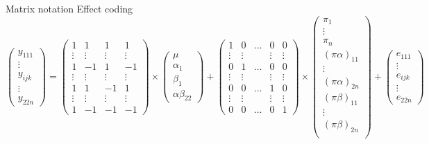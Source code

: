 \documentclass{beamer}
\begin{document}
\begin{frame}{Matrix notation}
{Effect coding}
{\tiny
\[
  \begin{pmatrix}
    y_{111}\\
    \vdots\\
    y_{ijk}\\
    \vdots\\
    y_{22n}
  \end{pmatrix}
=
  \begin{pmatrix}
    1 & 1 & 1 & 1\\
    \vdots & \vdots & \vdots & \vdots \\
    1 & -1 & 1 & -1\\
    \vdots & \vdots & \vdots & \vdots \\
    1 & 1 & -1 & 1\\
    \vdots & \vdots & \vdots & \vdots \\
    1 & -1 & -1 & -1
  \end{pmatrix}
\times
  \begin{pmatrix}
    \mu\\
    \alpha_1\\
    \beta_1\\
    \alpha\beta_{22}
  \end{pmatrix}
+
  \begin{pmatrix}
    1 & 0 & \dots & 0 & 0\\
    \vdots & \vdots && \vdots & \vdots \\
    0 & 1 & \dots & 0 & 0\\
    \vdots & \vdots && \vdots & \vdots \\
    0 & 0 & \dots & 1 & 0\\
    \vdots & \vdots && \vdots & \vdots \\
    0 & 0 & \dots & 0 & 1
  \end{pmatrix}
\times
  \begin{pmatrix}
    \pi_1\\
    \vdots\\
    \pi_n\\
    (\pi\alpha)_{11}\\
    \vdots\\
    (\pi\alpha)_{2n}\\
    (\pi\beta)_{11}\\
    \vdots\\
    (\pi\beta)_{2n}\\
  \end{pmatrix}
+
  \begin{pmatrix}
    e_{111}\\
    \vdots\\
    e_{ijk}\\
    \vdots\\
    e_{22n}
  \end{pmatrix}
\]
}
\end{frame}
\end{document}
